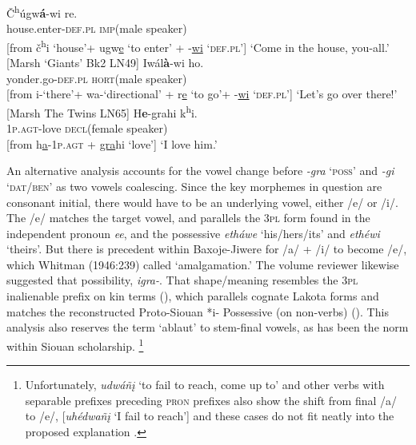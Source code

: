 \documentclass[output=paper]{LSP/langsci}
\begin{document}
\begin{exe}
\ex \gll \v{C}\textsuperscript{h}úgw\textbf{á}-wi    re. \\
house.enter-\textsc{def.pl}  \textsc{imp}(male speaker) \\

[from \v{c}\textsuperscript{h}i `house'+ ugw\underline{e} `to enter' + -\underline{wi} `\textsc{def.pl}']
\trans `Come in the house, you-all.'  [Marsh `Giants' Bk2 LN49]
\ex \gll Iwál\textbf{\`a}-wi          ho. \\
yonder.go-\textsc{def.pl} \textsc{hort}(male speaker)\\ 

[from i-`there'+ wa-`directional' + r\underline{e} `to go'+ -\underline{wi} `\textsc{def.pl}'] 		
\trans `Let's go over there!' 	[Marsh The Twins LN65]
\ex \gll  H\textbf{e}-grahi k\textsuperscript{h}i.  \\
1\textsc{p.agt}-love   \textsc{decl}(female speaker) \\

[from h\underline{a}-1\textsc{p.agt} + \underline{gra}hi `love'] 
\trans `I love him.'  
\end{exe} 

An alternative analysis accounts for the vowel change before \textit{-gra} `\textsc{poss}' and \textit{-gi} `\textsc{dat/ben}' as two vowels coalescing.  Since the key morphemes in question are consonant initial, there would have to be an underlying vowel, either /e/ or /i/.   The /e/ matches the target vowel, and parallels the \textsc{3pl} form found in the independent pronoun \textit{ee}, and the possessive \textit{etháwe} `his/hers/its' and \textit{eth\'ewi} `theirs'.  But there is precedent within Baxoje-Jiwere for /a/ + /i/ to become /e/, which Whitman (1946:239) called `amalgamation.'  The volume reviewer likewise suggested that possibility, \textit{igra-}.  That shape/meaning resembles the \textsc{3pl} inalienable prefix on kin terms (), which parallels cognate Lakota forms and matches the reconstructed Proto-Siouan *i- Possessive (on non-verbs) (\citealt{Rood1979}).  This analysis also reserves the term `ablaut' to stem-final vowels, as has been the norm within Siouan scholarship. \footnote{Unfortunately, \textit{udwá\~n\k{i}} `to fail to reach, come up to' and other verbs with separable prefixes preceding \textsc{pron} prefixes also show the shift from final /a/ to /e/, [\textit{uh\'edwa\~n\k{i}} `I fail to reach'] and these cases do not fit neatly into the proposed explanation \citep[240]{Whitman1946}.}
           
\end{document}
